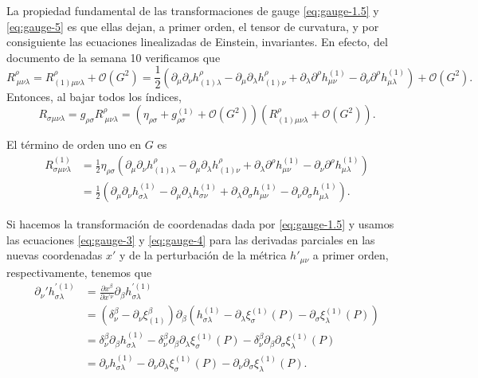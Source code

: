 \documentclass[letterpaper,11pt]{article}
\begin{document}
La propiedad fundamental de las transformaciones de gauge \eqref{eq:gauge-1.5} y \eqref{eq:gauge-5} es que ellas dejan, a primer orden, el tensor de curvatura, y por consiguiente las ecuaciones linealizadas de Einstein, invariantes. En efecto, del documento de la semana 10 verificamos que
\begin{equation}
R^{\rho}_{\ \mu\nu\lambda} = R^{\rho}_{(1)\mu\nu\lambda}+ \mathcal{O}(G^2) = \frac{1}{2} \left(\partial_{\mu} \partial_{\nu} h_{(1)\lambda}^{\rho} -\partial_{\mu} \partial_{\lambda} h_{(1)\nu}^{\rho} + \partial_{\lambda} \partial^{\rho} h_{\mu\nu}^{(1)} - \partial_{\nu} \partial^{\rho} h_{\mu\lambda}^{(1)}  \right) + \mathcal{O}(G^2).
\end{equation}
Entonces, al bajar todos los índices,
\begin{equation}
R_{\sigma \mu\nu\lambda} = g_ {\rho\sigma} R^{\rho}_{\ \mu\nu\lambda} = \left(\eta_{\rho\sigma} + g^{(1)}_{\rho\sigma} + \mathcal{O}(G^2) \right) \left( R^{\rho}_{(1)\mu\nu\lambda}+ \mathcal{O}(G^2) \right).
\end{equation}

El término de orden uno en $G$ es
\begin{align}
R_{\sigma \mu\nu\lambda}^{(1)} &= \frac{1}{2} \eta_{\rho\sigma}  \left(\partial_{\mu} \partial_{\nu} h_{(1)\lambda}^{\rho} -\partial_{\mu} \partial_{\lambda} h_{(1)\nu}^{\rho} + \partial_{\lambda} \partial^{\rho} h_{\mu\nu}^{(1)} - \partial_{\nu} \partial^{\rho} h_{\mu\lambda}^{(1)}  \right) \nonumber \\
&= \frac{1}{2} \left(\partial_{\mu} \partial_{\nu} h_{\sigma\lambda}^{(1)} - \partial_{\mu} \partial_{\lambda} h_{\sigma\nu}^{(1)} + \partial_{\lambda} \partial_{\sigma} h_{\mu\nu}^{(1)}- \partial_{\nu} \partial_{\sigma} h_{\mu\lambda}^{(1)}\right). \label{eq:gauge-6}
\end{align}

Si hacemos la transformación de coordenadas dada por \eqref{eq:gauge-1.5} y usamos las ecuaciones \eqref{eq:gauge-3} y \eqref{eq:gauge-4} para las derivadas parciales en las nuevas coordenadas $x'$ y de la perturbación de la métrica $h'_{\mu\nu}$ a primer orden, respectivamente, tenemos que
\begin{align}
\partial_{\nu}' h_{\sigma\lambda}^{'(1)} &= \frac{\partial x^{\beta}}{\partial x^{' \nu}}\partial_{\beta} h_{\sigma\lambda}^{'(1)} \nonumber \\
&= \left( \delta_{\nu}^{\beta} - \partial_{\nu} \xi^{\beta}_{(1)}\right) \partial_{\beta} \left( h_{\sigma\lambda}^{(1)} - \partial_{\lambda} \xi^{(1)}_{\sigma}(P) -  \partial_{\sigma} \xi_{\lambda}^{(1)}(P) \right)  \nonumber\\
&= \delta_{\nu}^{\beta} \partial_{\beta} h_{\sigma\lambda}^{(1)} - \delta_{\nu}^{\beta} \partial_{\beta} \partial_{\lambda} \xi^{(1)}_{\sigma}(P) - \delta_{\nu}^{\beta} \partial_{\beta} \partial_{\sigma} \xi_{\lambda}^{(1)}(P)  \nonumber \\
&=  \partial_{\nu} h_{\sigma\lambda}^{(1)} - \partial_{\nu} \partial_{\lambda} \xi^{(1)}_{\sigma}(P) - \partial_{\nu} \partial_{\sigma} \xi_{\lambda}^{(1)}(P) .
\end{align}
\end{document}
